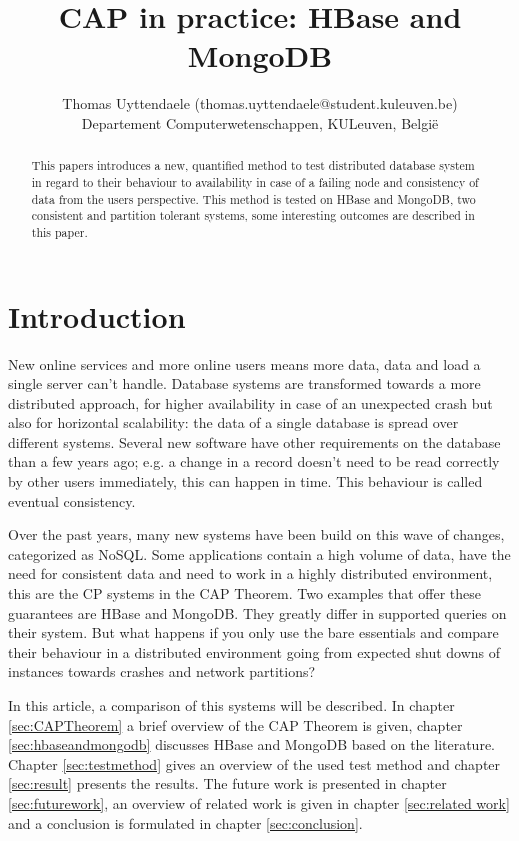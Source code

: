 \documentclass[10pt,conference,letterpaper]{IEEEtran}
\title{CAP in practice: HBase and MongoDB}
\author{Thomas Uyttendaele (thomas.uyttendaele@student.kuleuven.be) \\ 
Departement Computerwetenschappen, KULeuven, Belgi\"e}
\begin{document}
\maketitle

\begin{abstract}
This papers introduces a new, quantified method to test distributed database system in regard to their behaviour to availability in case of a failing node and consistency of data from the users perspective. This method is tested on HBase and MongoDB, two consistent and partition tolerant systems, some interesting outcomes are described in this paper. 
\end{abstract}


\section{Introduction}

New online services and more online users means more data, data and load a single server can't handle. Database systems are transformed towards a more distributed approach, for higher availability in case of an unexpected crash but also for horizontal scalability: the data of a single database is spread over different systems. Several new software have other requirements on the database than a few years ago; e.g. a change in a record doesn't need to be read correctly by other users immediately, this can happen in time. This behaviour is called eventual consistency. 

Over the past years, many new systems have been build on this wave of changes, categorized as NoSQL. Some applications contain a high volume of data, have the need for consistent data and need to work in a highly distributed environment, this are the CP systems in the CAP Theorem. Two examples that offer these guarantees are HBase and MongoDB. They greatly differ in supported queries on their system. But what happens if you only use the bare essentials and compare their behaviour in a distributed environment going from expected shut downs of instances towards crashes and network partitions? 

In this article, a comparison of this systems will be described. In chapter \ref{sec:CAPTheorem} a brief overview of the CAP Theorem is given, chapter \ref{sec:hbaseandmongodb} discusses HBase and MongoDB based on the literature. Chapter \ref{sec:testmethod} gives an overview of the used test method and chapter \ref{sec:result} presents the results. The future work is presented in chapter \ref{sec:futurework}, an overview of related work is given in chapter \ref{sec:related work} and a conclusion is formulated in chapter \ref{sec:conclusion}.  
\end{document}

